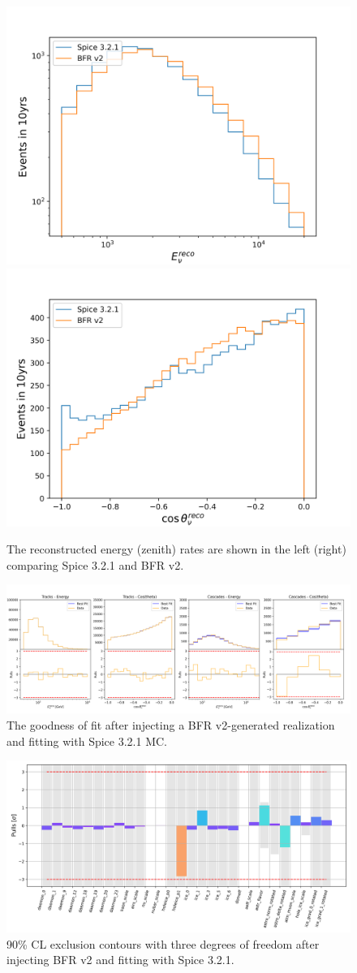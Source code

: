 \documentclass[main.tex]{subfiles}
\begin{document}
\begin{figure}
    \centering
    \includegraphics[width=0.45\linewidth]{figures/ice_investigate/reco_energy_distrib_lognorm.png}%
    \includegraphics[width=0.45\linewidth]{figures/ice_investigate/true_zenith_distrib.png}
    \caption{The reconstructed energy (zenith) rates are shown in the left (right) comparing Spice 3.2.1 and BFR v2.}\label{fig:bfr_spice_wow}
\end{figure}

\begin{figure}
    \centering
    \includegraphics[width=0.8\linewidth]{figures/ice_investigate/goodness_joint_injectbfr_fitspice_Realization_daemon_bfr_Asimov_sterile_0.png}
    \caption{The goodness of fit after injecting a BFR v2-generated realization and fitting with Spice 3.2.1 MC.}\label{fig:icetest_gof}
\end{figure}

\begin{figure}
    \centering
    \includegraphics[width=0.7\linewidth]{figures/pulls_Realization_daemon_bfr_Asimov_sterile_0_joint_injectbfr_fitspice.png}
    \caption{90\% CL exclusion contours with three degrees of freedom after injecting BFR v2 and fitting with Spice 3.2.1.}\label{fig:injectbfr_fitspice}
\end{figure}
\end{document}
